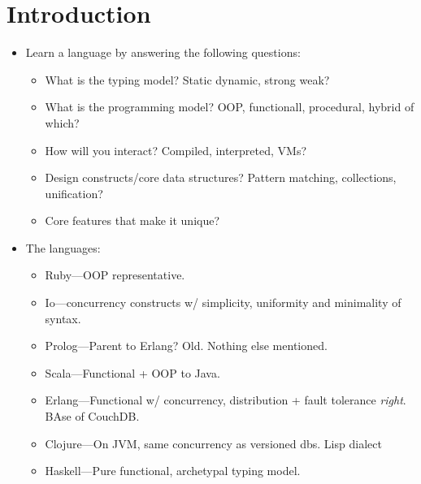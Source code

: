 \documentclass[10pt]{article}
\begin{document}
\onehalfspacing

\pagestyle{fancy}
\cfoot{\thepage/\pageref{LastPage}}

\tableofcontents

\newpage

\section{Introduction}

\begin{itemize}
    \item Learn a language by answering the following questions:
        \begin{itemize}
            \item What is the typing model? Static dynamic, strong weak?
            \item What is the programming model? OOP, functionall, procedural,
                hybrid of which?
            \item How will you interact? Compiled, interpreted, VMs?
            \item Design constructs/core data structures? Pattern matching,
                collections, unification?
            \item Core features that make it unique?
        \end{itemize}

    \item The languages:
        \begin{itemize}
            \item Ruby---OOP representative.
            \item Io---concurrency constructs w/ simplicity, uniformity and
                minimality of syntax.
            \item Prolog---Parent to Erlang? Old. Nothing else mentioned.
            \item Scala---Functional + OOP to Java.
            \item Erlang---Functional w/ concurrency, distribution + fault
                tolerance \emph{right}. BAse of CouchDB.\@
            \item Clojure---On JVM, same concurrency as versioned dbs. Lisp
                dialect
            \item Haskell---Pure functional, archetypal typing model.
        \end{itemize}


\end{itemize}
\end{document}
